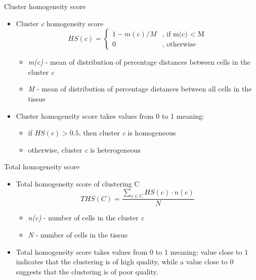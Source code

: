 \documentclass{beamer}
\begin{document}
\begin{frame}{Cluster homogeneity score}

\begin{itemize}
    \item<1-> Cluster \textit{c} homogeneity score
        \begin{equation*}
        HS(c)=
            \begin{cases}
                1 - m(c)/M &, \text{ if m(c) < M}\\
                0 &, \text{ otherwise}
            \end{cases}
        \end{equation*}
    \begin{itemize}
        \item<2-> [] \textit{m(c)} - mean of distribution of percentage distances between cells in the cluster \textit{c} 
        \item<3-> [] \textit{M} - mean of distribution of percentage distances between all cells in the tissue
    \end{itemize}
    \item<4-> Cluster homogeneity score takes values from 0 to 1 meaning:
    \begin{itemize}
        \item<5-> if \(HS(c) > 0.5\), then cluster \textit{c} is homogeneous
        \item<6-> otherwise, cluster \textit{c} is heterogeneous
    \end{itemize}
\end{itemize}
\end{frame}
\begin{frame}{Total homogeneity score}

\begin{itemize}
    \item<1-> Total homogeneity score of clustering C
        \[ THS(C) = \frac{\sum_{c \in C} HS(c) \cdot n(c)}{N} \]
    \begin{itemize}
        \item<2-> [] \textit{n(c)} - number of cells in the cluster \textit{c} 
        \item<3-> [] \textit{N} - number of cells in the tissue
    \end{itemize}
    \item <4-> Total homogeneity score takes values from 0 to 1 meaning: value close to 1 indicates that the clustering is of high quality, while a value close to 0 suggests that the clustering is of poor quality.
\end{itemize}
\end{frame}
\end{document}
